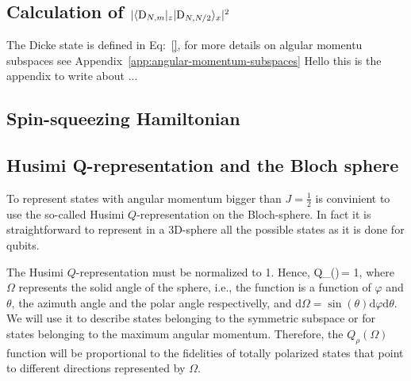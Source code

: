 \subsection{Calculation of $|\langle \textnormal{D}_{N,m} \vert_z\vert \textnormal{D}_{N,N/2} \rangle_x|^2$}
\label{app:calculation-dicke-overlap}

The Dicke state is defined in Eq:~\eqref{}, for more details on algular momentu subspaces see Appendix~\ref{app:angular-momentum-subspaces}
Hello this is the appendix to write about ...

\subsection{Spin-squeezing Hamiltonian}
\label{app:spin-squeezing-hamiltonian}

\subsection{Husimi Q-representation and the Bloch sphere}
\label{app:husimi-representation}

To represent states with angular momentum bigger than $J=\frac{1}{2}$ is convinient to use the so-called Husimi $Q$-representation \citep{} on the Bloch-sphere.
In fact it is straightforward to represent in a 3D-sphere all the possible states as it is done for qubits.

The Husimi $Q$-representation must be normalized to 1.
Hence,
\be
  \label{eq:ap2-husimi-integral-to-one}
  \int Q_\rho(\Omega)\,\Omega = 1,
\ee
where $\Omega$ represents the solid angle of the sphere, i.e., the function is a function of $\varphi$ and $\theta$, the azimuth angle and the polar angle respectivelly, and $\text{d}\Omega= \sin(\theta)\text{d}\varphi\text{d}\theta$.
We will use it to describe states belonging to the symmetric subspace or for states belonging to the maximum angular momentum.
Therefore, the $Q_\rho(\Omega)$ function will be proportional to the fidelities of totally polarized states that point to different directions represented by $\Omega$.


